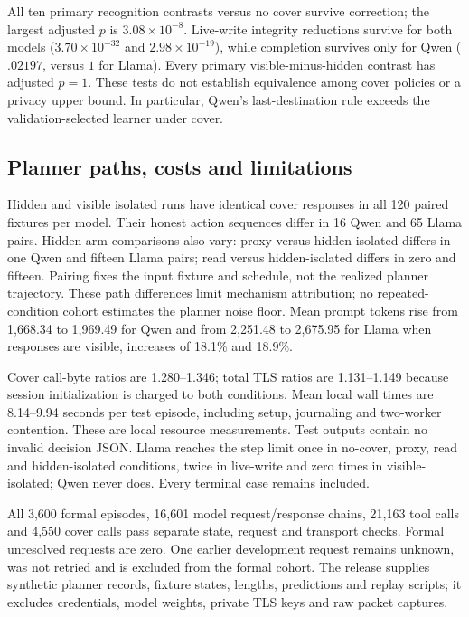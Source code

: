 All ten primary recognition contrasts versus no cover survive correction; the largest adjusted $p$ is $3.08\times10^{-8}$. Live-write integrity reductions survive for both models ($3.70\times10^{-32}$ and $2.98\times10^{-19}$), while completion survives only for Qwen ($.02197$, versus $1$ for Llama). Every primary visible-minus-hidden contrast has adjusted $p=1$. These tests do not establish equivalence among cover policies or a privacy upper bound. In particular, Qwen's last-destination rule exceeds the validation-selected learner under cover.



\subsection{Planner paths, costs and limitations}
Hidden and visible isolated runs have identical cover responses in all 120 paired fixtures per model. Their honest action sequences differ in 16 Qwen and 65 Llama pairs. Hidden-arm comparisons also vary: proxy versus hidden-isolated differs in one Qwen and fifteen Llama pairs; read versus hidden-isolated differs in zero and fifteen. Pairing fixes the input fixture and schedule, not the realized planner trajectory. These path differences limit mechanism attribution; no repeated-condition cohort estimates the planner noise floor. Mean prompt tokens rise from 1,668.34 to 1,969.49 for Qwen and from 2,251.48 to 2,675.95 for Llama when responses are visible, increases of 18.1\% and 18.9\%.

Cover call-byte ratios are 1.280--1.346; total TLS ratios are 1.131--1.149 because session initialization is charged to both conditions. Mean local wall times are 8.14--9.94 seconds per test episode, including setup, journaling and two-worker contention. These are local resource measurements. Test outputs contain no invalid decision JSON. Llama reaches the step limit once in no-cover, proxy, read and hidden-isolated conditions, twice in live-write and zero times in visible-isolated; Qwen never does. Every terminal case remains included.

All 3,600 formal episodes, 16,601 model request/response chains, 21,163 tool calls and 4,550 cover calls pass separate state, request and transport checks. Formal unresolved requests are zero. One earlier development request remains unknown, was not retried and is excluded from the formal cohort. The release supplies synthetic planner records, fixture states, lengths, predictions and replay scripts; it excludes credentials, model weights, private TLS keys and raw packet captures.

